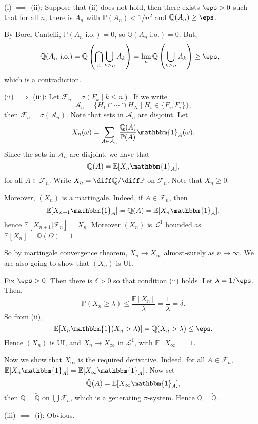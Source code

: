 \documentclass[12pt]{article}
\begin{document}
\begin{proofbox}
	

	(i) $\implies$ (ii): Suppose that (ii) does not hold, then there exists $\eps > 0$ such that for all $n$, there is $A_n$ with $\mathbb{P}(A_n) < 1/n^2$ and $\mathbb{Q}(A_n) \geq \eps$.

	By Borel-Cantelli, $\mathbb{P}(A_n \text{ i.o.}) = 0$, so $\mathbb{Q}(A_n \text{ i.o.}) = 0$. But,
	\begin{align*}
		\mathbb{Q}(A_n \text{ i.o.}) &= \mathbb{Q} \left( \bigcap_n \bigcup_{k \geq n} A_k \right) = \lim_n \mathbb{Q} \left( \bigcup_{k \geq n}  A_k \right) \geq \eps,
	\end{align*}
	which is a contradiction.

	(ii) $\implies$ (iii): Let $\mathcal{F}_n = \sigma(F_k \mid k \leq n)$. If we write
	\[
		\mathcal{A}_{n} = \{H_1 \cap \cdots \cap H_N \mid H_i \in \{F_i, F_i^{c}\}\},
	\]
	then $\mathcal{F}_n = \sigma(\mathcal{A}_n)$. Note that sets in $\mathcal{A}_n$ are disjoint. Let
	\[
	X_n(\omega) = \sum_{A \in \mathcal{A}_n} \frac{\mathbb{Q}(A)}{\mathbb{P}(A)} \mathbbm{1}_{A}(\omega).
	\]
	Since the sets in $\mathcal{A}_n$ are disjoint, we have that
	\[
	\mathbb{Q}(A) = \mathbb{E}[X_n \mathbbm{1}_{A}],
	\]
	for all $A \in \mathcal{F}_n$. Write $X_n = \diff \mathbb{Q} / \diff \mathbb{P}$ on $\mathcal{F}_n$. Note that $X_n \geq 0$.

	Moreover, $(X_n)$ is a martingale. Indeed, if $A \in \mathcal{F}_n$, then
	\[
	\mathbb{E}[X_{n+1} \mathbbm{1}_{A}] = \mathbb{Q}(A) = \mathbb{E}[X_n \mathbbm{1}_{A}],
	\]
	hence $\mathbb{E}[X_{n+1} | \mathcal{F}_n] = X_n$. Moreover $(X_n)$ is $\mathcal{L}^1$ bounded as $\mathbb{E}[X_n] = \mathbb{Q}(\Omega) = 1$.

	So by martingale convergence theorem, $X_n \to X_\infty$ almost-surely as $n \to \infty$. We are also going to show that $(X_n)$ is UI. 

	Fix $\eps > 0$. Then there is $\delta > 0$ so that condition (ii) holds. Let $\lambda = 1/\eps$. Then,
	\[
	\mathbb{P}(X_n \geq \lambda) \leq \frac{\mathbb{E}[X_n]}{\lambda} = \frac{1}{\lambda} = \delta.
	\]
	So from (ii),
	\[
	\mathbb{E}[X_n \mathbbm{1}(X_n > \lambda)] = \mathbb{Q}(X_n > \lambda) \leq \eps.
	\]
	Hence $(X_n)$ is UI, and $X_n \to X_\infty$ in $\mathcal{L}^1$, with $\mathbb{E}[X_\infty] = 1$.

	Now we show that $X_\infty$ is the required derivative. Indeed, for all $A \in \mathcal{F}_n$, $\mathbb{E}[X_n \mathbbm{1}_{A}] = \mathbb{E}[X_\infty \mathbbm{1}_{A}]$. Now set
	\[
		\tilde{\mathbb{Q}}(A) = \mathbb{E}[X_\infty \mathbbm{1}_{A}],
	\]
	then $\mathbb{Q} = \tilde{\mathbb{Q}}$ on $\bigcup \mathcal{F}_n$, which is a generating $\pi$-system. Hence $\mathbb{Q} = \tilde{\mathbb{Q}}$.

	(iii) $\implies$ (i): Obvious.
\end{proofbox}
\end{document}

